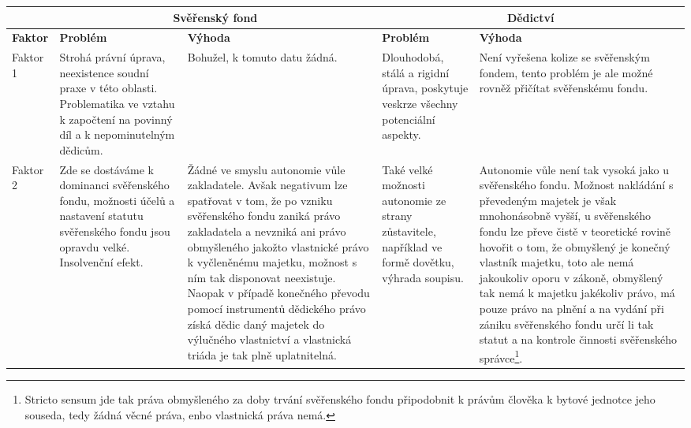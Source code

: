 \documentclass{article}
\begin{document}

\noindent\begin{tabularx}{\textwidth}{X|X|X|X|X|}
\cline{2-5}
                               & \multicolumn{2}{c|}{Svěřenský fond} & \multicolumn{2}{c|}{Dědictví} \\ \hline
\multicolumn{1}{|l|}{\textbf{Faktor}}   & \textbf{Problém}           & \textbf{Výhoda}          & \textbf{Problém}        & \textbf{Výhoda}       \\ \hline
\multicolumn{1}{|l|}{Faktor 1} &         
Strohá právní úprava, neexistence soudní praxe v této oblasti.
Problematika ve vztahu k započtení na povinný díl a k nepominutelným dědicům.
&      Bohužel, k tomuto datu žádná.  
&      Dlouhodobá, stálá a rigidní úprava, poskytuje veskrze všechny potenciální aspekty.          &       Není vyřešena kolize se svěřenským fondem, tento problém je ale možné rovněž přičítat svěřenskému fondu.       \\ \hline
\multicolumn{1}{|l|}{Faktor 2} &         Zde se dostáváme k dominanci svěřenského fondu, možnosti účelů a nastavení statutu svěřenského fondu jsou opravdu velké. Insolvenční efekt.          &        Žádné ve smyslu autonomie vůle zakladatele. Avšak negativum lze spatřovat v tom, že po vzniku svěřenského fondu zaniká právo zakladatela a nevzniká ani právo obmyšleného jakožto vlastnické právo k vyčleněnému majetku, možnost s ním tak disponovat neexistuje. Naopak v případě konečného převodu pomocí instrumentů dědického právo získá dědic daný majetek do výlučného vlastnictví a vlastnická triáda je tak plně uplatnitelná.        &       Také velké možnosti autonomie ze strany zůstavitele, například ve formě dovětku, výhrada soupisu.         &      Autonomie vůle není tak vysoká jako u svěřenského fondu. Možnost nakládání s převedeným majetek je však mnohonásobně vyšší, u svěřenského fondu lze převe čistě v teoretické rovině hovořit o tom, že obmyšlený je konečný vlastník majetku, toto ale nemá jakoukoliv oporu v zákoně, obmyšlený tak nemá k majetku jakékoliv právo, má pouze právo na plnění a na vydání při zániku svěřenského fondu určí li tak statut a na kontrole činnosti svěřenského správce\footnote{Stricto sensum jde tak práva obmyšleného za doby trvání svěřenského fondu připodobnit k právům člověka k bytové jednotce jeho souseda, tedy žádná věcné práva, enbo vlastnická práva nemá.}.        \\ \hline
\end{tabularx}
\end{document}
